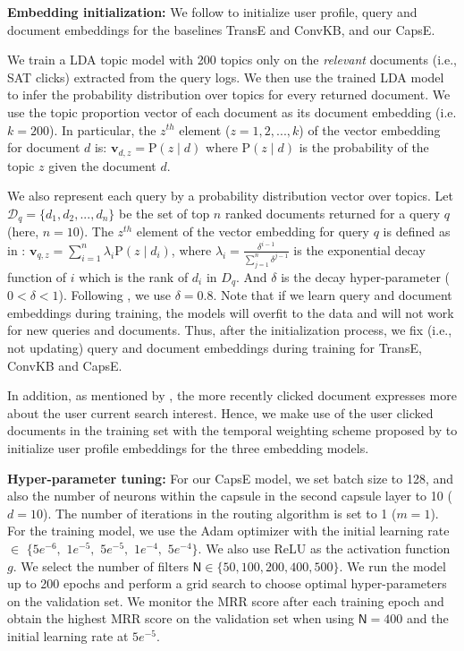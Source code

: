 \documentclass[11pt,a4paper]{article}
\begin{document}
\noindent\textbf{Embedding initialization:} We follow \citet{vu2017search}  to initialize user profile, query and document embeddings for the baselines TransE and ConvKB, and our CapsE.

We train a LDA topic model \citep{Blei2003} with 200 topics only on the \textit{relevant} documents (i.e., SAT clicks) extracted from the query logs. We then use the trained LDA model to infer the probability distribution over topics for every returned document. We use the topic proportion vector of each document as its document embedding (i.e. $k=200$). In particular, the $z^{th}$ element ($z = 1,2,...,k$) of the vector embedding for document $d$ is: $\boldsymbol{v}_{d,z} = \mathrm{P}(z \mid d)$ where $\mathrm{P}(z \mid d)$ is the probability of the topic $z$ given the document $d$. 

We also represent each query by a probability distribution vector over topics. 
Let $\mathcal{D}_q = \{d_1, d_2, ..., d_n\}$ be the set of top $n$ ranked documents returned for a query $q$ (here, $n=10$). The $z^{th}$ element of the vector embedding for query $q$ is  defined as in \citep{vu2017search}: $\boldsymbol{v}_{q,z} = \sum\nolimits_{i=1}^{n} \lambda_i \mathrm{P}(z \mid d_i)$, where $\lambda_i = \frac{\delta^{{i} - 1}}{\sum_{j=1}^{n}\delta^{{j} - 1}}$ is the exponential decay function of $i$ which is the rank of $d_i$ in $D_q$. And $\delta$ is the decay hyper-parameter ($0 < \delta < 1$). Following \citet{vu2017search}, we use $\delta = 0.8$.
Note that if we learn query and document embeddings during training, the models will overfit to the data and will not work for new queries and documents. 
Thus, after the initialization process, we fix (i.e., not updating) query and document embeddings during training for TransE, ConvKB and CapsE.

In addition, as mentioned by \citet{Bennett2012}, the more recently clicked document expresses more about the user current search interest. Hence, we make use of the user clicked documents in the training set with the temporal weighting scheme proposed by \citet{Vu2015} to initialize user profile embeddings for the three embedding models.

\noindent\textbf{Hyper-parameter tuning:} 
For our CapsE model, we set batch size to 128, and also the number of neurons within the capsule in the second capsule layer to 10 ($d = 10$). The number of iterations in the routing algorithm is set to 1 ($m = 1$).
For the training model, we use the Adam optimizer with the initial learning rate $\in$ $\{5e^{-6},$ $1e^{-5},$ $5e^{-5},$ $1e^{-4},$ $5e^{-4}\}$. We also use ReLU as the activation function $g$. 
We select the number of filters $\mathsf{N} \in \{50, 100, 200, 400, 500\}$.
We run the model up to 200 epochs and perform a grid search to choose optimal hyper-parameters on the validation set.
We monitor the MRR score after each training epoch and obtain the highest MRR score on the validation set when using $\mathsf{N} = 400$ and the initial learning rate at $5e^{-5}$. 
\end{document}
